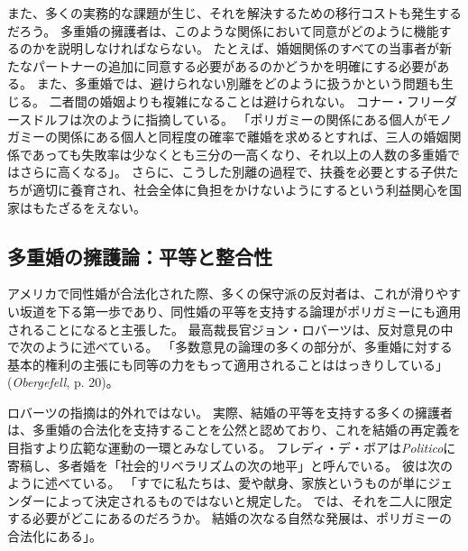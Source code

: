 \documentclass[paper=a4,book,openany]{jlreq}
\newcommand{\ig}[1]{}           %
\begin{document}
また、多くの実務的な課題が生じ、それを解決するための移行コストも発生するだろう。
多重婚の擁護者は、このような関係において同意がどのように機能するのかを説明しなければならない。
たとえば、婚姻関係のすべての当事者が新たなパートナーの追加に同意する必要があるのかどうかを明確にする必要がある。
また、多重婚では、避けられない別離をどのように扱うかという問題も生じる。
二者間の婚姻よりも複雑になることは避けられない。
コナー・フリーダースドルフは次のように指摘している。
「ポリガミーの関係にある個人がモノガミーの関係にある個人と同程度の確率で離婚を求めるとすれば、三人の婚姻関係であっても失敗率は少なくとも三分の一高くなり、それ以上の人数の多重婚ではさらに高くなる」\citep{friedersdorf15:_case_encour_polyg}。
さらに、こうした別離の過程で、扶養を必要とする子供たちが適切に養育され、社会全体に負担をかけないようにするという利益関心を国家はもたざるをえない。

\subsection{多重婚の擁護論：平等と整合性}

アメリカで同性婚が合法化された際、多くの保守派の反対者は、これが滑りやすい坂道を下る第一歩であり、同性婚の平等を支持する論理がポリガミーにも適用されることになると主張した。
最高裁長官ジョン・ロバーツ\ig{John Roberts}は、反対意見の中で次のように述べている。
「多数意見の論理の多くの部分が、多重婚に対する基本的権利の主張にも同等の力をもって適用されることははっきりしている」(\emph{Obergefell}, p. 20)。

ロバーツ\ig{John Roberts}の指摘は的外れではない。
実際、結婚の平等を支持する多くの擁護者は、多重婚の合法化を支持することを公然と認めており、これを結婚の再定義を目指すより広範な運動の一環とみなしている。
フレディ・デ・ボアは\emph{Politico}に寄稿し、多者婚を「社会的リベラリズムの次の地平」と呼んでいる。
彼は次のように述べている。
「すでに私たちは、愛や献身、家族というものが単にジェンダーによって決定されるものではないと規定した。
では、それを二人に限定する必要がどこにあるのだろうか。
結婚の次なる自然な発展は、ポリガミーの合法化にある」\citep{deboer15:_it_time_legal_polyg}。
\end{document}
